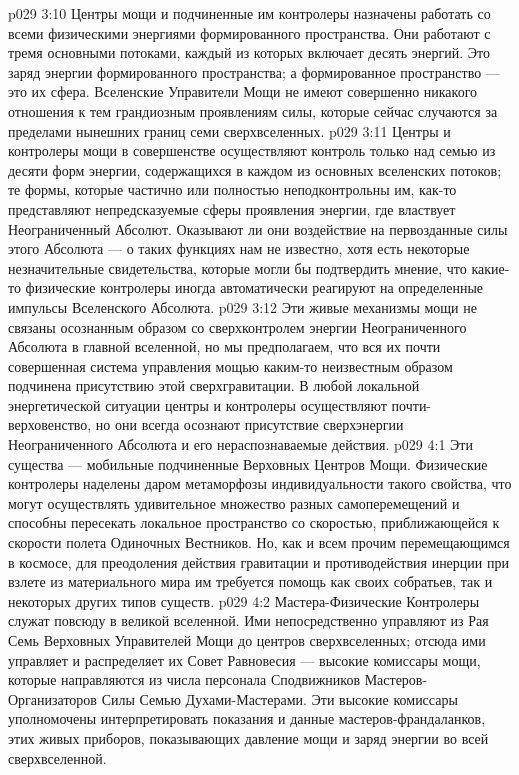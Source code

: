 \vs p029 3:10 \pc Центры мощи и подчиненные им контролеры назначены работать со всеми физическими энергиями формированного пространства. Они работают с тремя основными потоками, каждый из которых включает десять энергий. Это заряд энергии формированного пространства; а формированное пространство --- это их сфера. Вселенские Управители Мощи не имеют совершенно никакого отношения к тем грандиозным проявлениям силы, которые сейчас случаются за пределами нынешних границ семи сверхвселенных.
\vs p029 3:11 Центры и контролеры мощи в совершенстве осуществляют контроль только над семью из десяти форм энергии, содержащихся в каждом из основных вселенских потоков; те формы, которые частично или полностью неподконтрольны им, как\hyp{}то представляют непредсказуемые сферы проявления энергии, где властвует Неограниченный Абсолют. Оказывают ли они воздействие на первозданные силы этого Абсолюта --- о таких функциях нам не известно, хотя есть некоторые незначительные свидетельства, которые могли бы подтвердить мнение, что какие\hyp{}то физические контролеры иногда автоматически реагируют на определенные импульсы Вселенского Абсолюта.
\vs p029 3:12 Эти живые механизмы мощи не связаны осознанным образом со сверхконтролем энергии Неограниченного Абсолюта в главной вселенной, но мы предполагаем, что вся их почти совершенная система управления мощью каким\hyp{}то неизвестным образом подчинена присутствию этой сверхгравитации. В любой локальной энергетической ситуации центры и контролеры осуществляют почти\hyp{}верховенство, но они всегда осознают присутствие сверхэнергии Неограниченного Абсолюта и его нераспознаваемые действия.
\vs p029 4:1 Эти существа --- мобильные подчиненные Верховных Центров Мощи. Физические контролеры наделены даром метаморфозы индивидуальности такого свойства, что могут осуществлять удивительное множество разных самоперемещений и способны пересекать локальное пространство со скоростью, приближающейся к скорости полета Одиночных Вестников. Но, как и всем прочим перемещающимся в космосе, для преодоления действия гравитации и противодействия инерции при взлете из материального мира им требуется помощь как своих собратьев, так и некоторых других типов существ.
\vs p029 4:2 Мастера\hyp{}Физические Контролеры служат повсюду в великой вселенной. Ими непосредственно управляют из Рая Семь Верховных Управителей Мощи до центров сверхвселенных; отсюда ими управляет и распределяет их Совет Равновесия --- высокие комиссары мощи, которые направляются из числа персонала Сподвижников Мастеров\hyp{}Организаторов Силы Семью Духами\hyp{}Мастерами. Эти высокие комиссары уполномочены интерпретировать показания и данные мастеров\hyp{}франдаланков, этих живых приборов, показывающих давление мощи и заряд энергии во всей сверхвселенной.
